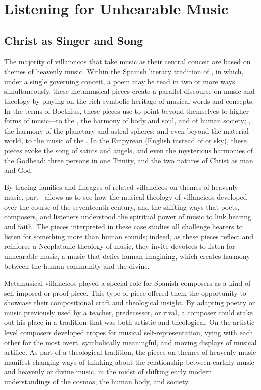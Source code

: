 
\part{Listening for Unhearable Music}
\label{part:ListeningForUnhearableMusic}

\chapter{Christ as Singer and Song}

The majority of villancicos that take music as their central conceit are based
on themes of heavenly music.
Within the Spanish literary tradition of , in which, under a
single governing conceit, a poem may be read in two or more ways simultaneously,
these metamusical pieces create a parallel discourse on music and theology by
playing on the rich symbolic heritage of musical words and concepts.
In the terms of Boethius, these pieces use  to point
beyond themselves to higher forms of music---to the , the
harmony of body and soul, and of human society; , the
harmony of the planetary and astral spheres; and even beyond the material world,
to the music of the .
In the Empyrean (English  instead of  or sky), these
pieces evoke the song of saints and angels, and even the mysterious harmonies of
the Godhead: three persons in one Trinity, and the two natures of Christ as
man and God.

By tracing families and lineages of related villancicos on themes of heavenly
music, part~\ref{part:ListeningForUnhearableMusic} allows us to see how the
musical theology of villancicos developed over the course of the seventeenth
century, and the shifting ways that poets, composers, and listeners understood
the spiritual power of music to link hearing and faith.
The pieces interpreted in these case studies all challenge hearers to listen for
something more than human sounds; indeed, as these pieces reflect and reinforce
a Neoplatonic theology of music, they invite devotees to listen for unhearable
music, a music that defies human imagining, which creates harmony between the
human community and the divine.

Metamusical villancicos played a special role for Spanish composers as a kind of
self-imposed  or proof piece.
This type of piece offered them the opportunity to showcase their compositional
craft and theological insight. 
By adapting poetry or music previously used by a teacher, predecessor, or rival,
a composer could stake out his place in a tradition that was both artistic and
theological.
On the artistic level composers developed tropes for musical
self-representation, vying with each other for the most overt, symbolically
meaningful, and moving displays of musical artifice.
As part of a theological tradition, the pieces on themes of heavenly music
manifest changing ways of thinking about the relationship between earthly music
and heavenly or divine music, in the midst of shifting early modern
understandings of the cosmos, the human body, and society.


